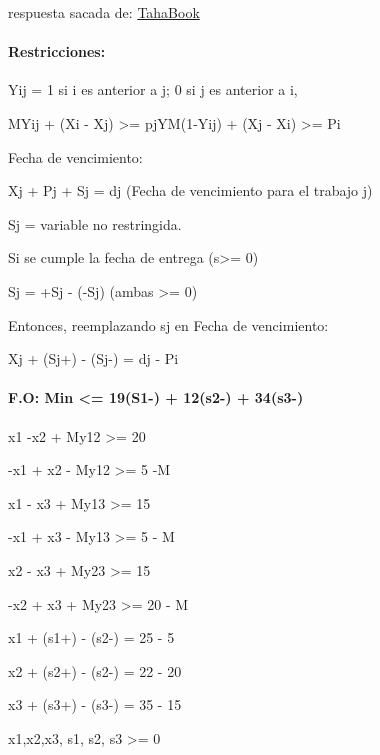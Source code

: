 \documentclass[11pt]{article}
\begin{document}
respuesta sacada de:
\href{https://books.google.com.co/books?id=3oHztjMSuL8C\&pg=PA369\&lpg=PA369\&dq=utiliza\%20una\%20sola\%20m\%C3\%A1quina\%20para\%20procesar\%20tres\%20trabajos.\%20taha\&source=bl\&ots=nNCC9b6NBM\&sig=qw95O8lgukZwb-2QG3vqQdJN2hY\&hl=es-419\&sa=X\&ved=2ahUKEwjIrfSMj83eAhXNoFMKHb1XAToQ6AEwAnoECAgQAQ\&fbclid=IwAR20m6S9G_2GUK4q4cRcgOgwWTggyRpDtu2wzyaoyqaHf_0CwwxB71Z8eBI\#v=onepage\&q=utiliza\%20una\%20sola\%20m\%C3\%A1quina\%20para\%20procesar\%20tres\%20trabajos.\%20taha\&f=false}{TahaBook}

\paragraph{Restricciones:}\label{restricciones}

Yij = 1 si i es anterior a j; 0 si j es anterior a i,

MYij + (Xi - Xj) \textgreater{}= pjYM(1-Yij) + (Xj - Xi) \textgreater{}=
Pi

Fecha de vencimiento:

Xj + Pj + Sj = dj (Fecha de vencimiento para el trabajo j)

Sj = variable no restringida.

Si se cumple la fecha de entrega (s\textgreater{}= 0)

Sj = +Sj - (-Sj) (ambas \textgreater{}= 0)

Entonces, reemplazando sj en Fecha de vencimiento:

Xj + (Sj+) - (Sj-) = dj - Pi

\paragraph{F.O: Min \textless{}= 19(S1-) + 12(s2-) +
34(s3-)}\label{f.o-min-19s1--12s2--34s3-}

x1 -x2 + My12 \textgreater{}= 20

-x1 + x2 - My12 \textgreater{}= 5 -M

x1 - x3 + My13 \textgreater{}= 15

-x1 + x3 - My13 \textgreater{}= 5 - M

x2 - x3 + My23 \textgreater{}= 15

-x2 + x3 + My23 \textgreater{}= 20 - M

x1 + (s1+) - (s2-) = 25 - 5

x2 + (s2+) - (s2-) = 22 - 20

x3 + (s3+) - (s3-) = 35 - 15

x1,x2,x3, s1, s2, s3 \textgreater{}= 0
\end{document}
